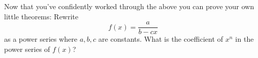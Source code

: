 Now that you've confidently worked through the above 
you can prove your own little theorems:
Rewrite
\[
f(x) = \frac{a}{b - cx}
\]
as a power series where $a,b,c$ are constants.
What is the coefficient of $x^n$ in the power series of $f(x)$?  
